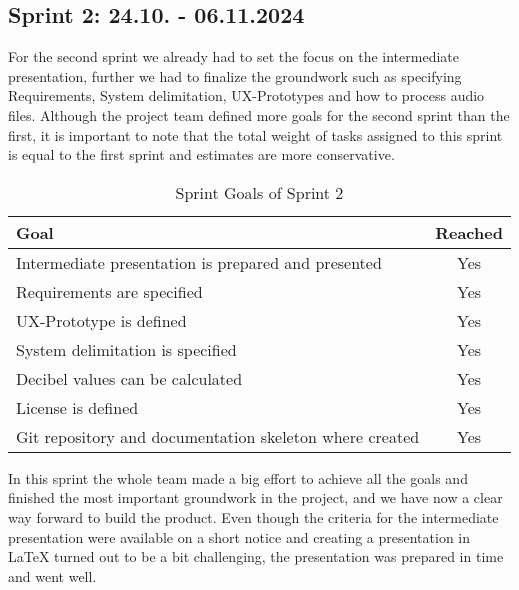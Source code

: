 \subsection{Sprint 2: 24.10. - 06.11.2024}\label{subsec:sprint-2}
For the second sprint we already had to set the focus on the intermediate presentation, further we had to finalize the
groundwork such as specifying Requirements, System delimitation, UX-Prototypes and how to process audio files.
Although the project team defined more goals for the second sprint than the first, it is important to note that the total weight of tasks assigned to this
sprint is equal to the first sprint and estimates are more conservative.
\begin{table}[H]
    \centering
    \begin{tabularx}{\textwidth}{X c}
        \toprule
        \textbf{Goal}                                         & \textbf{Reached} \\
        \midrule
        Intermediate presentation is prepared and presented   & Yes              \\
        \midrule
        Requirements are specified                            & Yes              \\
        \midrule
        UX-Prototype is defined                               & Yes              \\
        \midrule
        System delimitation is specified                      & Yes              \\
        \midrule
        Decibel values can be calculated                      & Yes              \\
        \midrule
        License is defined                                    & Yes              \\
        \midrule
        Git repository and documentation skeleton where created & Yes            \\
        \bottomrule
    \end{tabularx}
    \caption{Sprint Goals of Sprint 2}\label{tab:sprint_goals2}
\end{table}
In this sprint the whole team made a big effort to achieve all the goals and finished the most important groundwork in
the project, and we have now a clear way forward to build the product.
Even though the criteria for the intermediate presentation were available on a short notice and creating a presentation
in LaTeX turned out to be a bit challenging, the presentation was prepared in time and went well.

